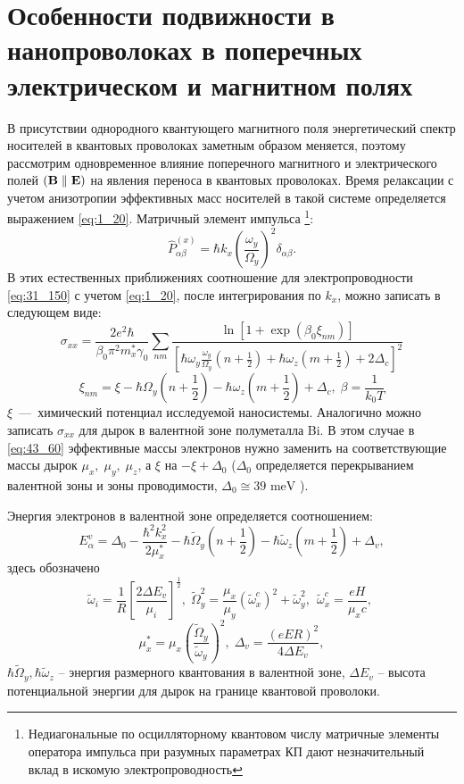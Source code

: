 \section{Особенности подвижности в нанопроволоках в поперечных электрическом и магнитном полях} \label{sect4_3}
В присутствии однородного квантующего магнитного поля энергетический спектр носителей в квантовых проволоках заметным образом меняется, поэтому рассмотрим одновременное влияние поперечного магнитного и электрического полей $(\boldsymbol{\mathbf{B}}\parallel\boldsymbol{\mathbf{E}})$ на явления переноса в квантовых проволоках. Время релаксации с учетом анизотропии эффективных масс носителей в такой системе определяется выражением \eqref{eq:1_20}. Матричный элемент импульса \footnote{Недиагональные по осцилляторному квантовом числу матричные элементы оператора импульса при разумных параметрах КП дают незначительный вклад в искомую электропроводность}:
\[
	\hat{P}^{(x)}_{\alpha \beta }=\hbar k_x{\left(\frac{\omega_y}{\Omega_y}\right)}^2 \delta_{\alpha \beta }.
\]
В этих естественных приближениях соотношение для электропроводности \eqref{eq:31_150} с учетом  \eqref{eq:1_20}, после интегрирования по $k_x$, можно записать в следующем виде:
\begin{equation} \label{eq:43_60}
	\sigma_{xx}=\frac{2 e^2\hbar}{\beta_0 \pi^2 m^*_x \gamma_0} \sum_{nm}{\frac{\ln \left[1+\exp\left(\beta_0 \xi_{nm}\right)\right]}{\left[\hbar \omega_y \frac{\omega_y}{\Omega_y}\left(n+\frac{1}{2}\right)+\hbar \omega_z\left(m+\frac{1}{2}\right)+2\Delta_c\right]^2}}
\end{equation}
\[
	\xi_{nm}=\xi -\hbar \Omega_y \left(n+\frac{1}{2}\right)-\hbar \omega_z\left(m+\frac{1}{2}\right)+\Delta_c,\;
	\beta =\frac{1}{k_0 T}
\]
$\xi $~---~химический потенциал исследуемой наносистемы. Аналогично можно записать $\sigma_{xx}$ для дырок в валентной зоне полуметалла Bi. В этом случае в \eqref{eq:43_60} эффективные массы электронов нужно заменить на соответствующие массы дырок $\mu_x,\; \mu_y,\; \mu_z$, а $\xi$  на $-\xi +\Delta_0$ ($\Delta_0$ определяется перекрыванием валентной зоны и зоны проводимости, $\Delta_0\cong 39\text{ meV}$ \cite{Levin2009a}).

Энергия электронов в валентной зоне определяется соотношением:
\[
	E^v_{\alpha }={\Delta }_0-\frac{{\hbar }^2k^2_x}{2{\mu }^*_x}-\hbar {\widetilde{\Omega }}_y\left(n+\frac{1}{2}\right)-\hbar {\widetilde{\omega }}_z\left(m+\frac{1}{2}\right)+{\Delta }_v,
\]
здесь обозначено
\[
	\widetilde{\omega}_i=\frac{1}{R}{\left[\frac{2 \Delta E_v}{\mu_i}\right]}^{\frac{1}{2}},\;
	{\widetilde{\Omega }}^2_y=\frac{\mu_x}{\mu_y}{\left({\widetilde{\omega }}^c_x\right)}^2+{\widetilde{\omega }}^2_y,\ \ {\widetilde{\omega }}^c_x=\frac{eH}{{\mu }_xc},\;
\]
\[
	\mu^*_x=\mu_x{\left(\frac{\widetilde{\Omega}_y}{\widetilde{\omega}_y}\right)}^2,\;
	\Delta_v = \frac{{\left(eER\right)}^2}{4\Delta E_v},
\]
$\hbar {\widetilde{\Omega }}_y, \hbar {\widetilde{\omega }}_z$ -- энергия размерного квантования в валентной зоне, $\Delta E_v$ -- высота потенциальной энергии для дырок на границе квантовой проволоки.

